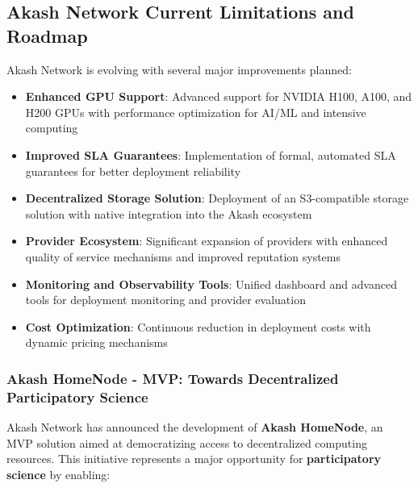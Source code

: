 \documentclass[11pt,a4paper]{article}
\begin{document}
	\subsection{Akash Network Current Limitations and Roadmap}
	
	Akash Network is evolving with several major improvements planned:
	
	\begin{itemize}
		\item \textbf{Enhanced GPU Support}: Advanced support for NVIDIA H100, A100, and H200 GPUs with performance optimization for AI/ML and intensive computing
		
		\item \textbf{Improved SLA Guarantees}: Implementation of formal, automated SLA guarantees for better deployment reliability
		
		\item \textbf{Decentralized Storage Solution}: Deployment of an S3-compatible storage solution with native integration into the Akash ecosystem
		
		\item \textbf{Provider Ecosystem}: Significant expansion of providers with enhanced quality of service mechanisms and improved reputation systems
		
		\item \textbf{Monitoring and Observability Tools}: Unified dashboard and advanced tools for deployment monitoring and provider evaluation
		
		\item \textbf{Cost Optimization}: Continuous reduction in deployment costs with dynamic pricing mechanisms
	\end{itemize}
	
	\subsubsection{Akash HomeNode - MVP: Towards Decentralized Participatory Science}
	
	Akash Network has announced the development of \textbf{Akash HomeNode}, an MVP solution aimed at democratizing access to decentralized computing resources. This initiative represents a major opportunity for \textbf{participatory science} by enabling:
	
\end{document}
